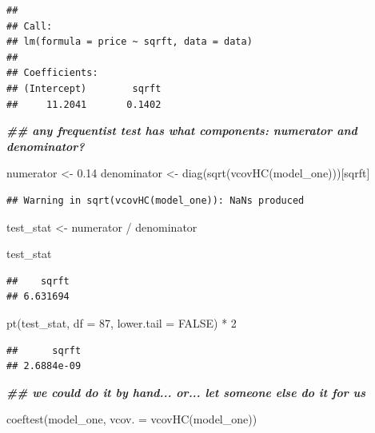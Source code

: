 \documentclass[
]{book}
\newenvironment{Shaded}{\begin{snugshade}}{\end{snugshade}}
\newcommand{\AttributeTok}[1]{\textcolor[rgb]{0.77,0.63,0.00}{#1}}
\newcommand{\ConstantTok}[1]{\textcolor[rgb]{0.00,0.00,0.00}{#1}}
\newcommand{\DecValTok}[1]{\textcolor[rgb]{0.00,0.00,0.81}{#1}}
\newcommand{\DocumentationTok}[1]{\textcolor[rgb]{0.56,0.35,0.01}{\textbf{\textit{#1}}}}
\newcommand{\FloatTok}[1]{\textcolor[rgb]{0.00,0.00,0.81}{#1}}
\newcommand{\FunctionTok}[1]{\textcolor[rgb]{0.00,0.00,0.00}{#1}}
\newcommand{\NormalTok}[1]{#1}
\newcommand{\OtherTok}[1]{\textcolor[rgb]{0.56,0.35,0.01}{#1}}
\newcommand{\SpecialCharTok}[1]{\textcolor[rgb]{0.00,0.00,0.00}{#1}}
\newcommand{\StringTok}[1]{\textcolor[rgb]{0.31,0.60,0.02}{#1}}
\theoremstyle{definition}
\theoremstyle{definition}
\theoremstyle{definition}
\theoremstyle{definition}
\theoremstyle{remark}
\begin{document}
\begin{verbatim}
## 
## Call:
## lm(formula = price ~ sqrft, data = data)
## 
## Coefficients:
## (Intercept)        sqrft  
##     11.2041       0.1402
\end{verbatim}

\begin{Shaded}
\begin{Highlighting}[]
\DocumentationTok{\#\# any frequentist test has what components: numerator and denominator? }

\NormalTok{numerator   }\OtherTok{\textless{}{-}} \FloatTok{0.14}
\NormalTok{denominator }\OtherTok{\textless{}{-}} \FunctionTok{diag}\NormalTok{(}\FunctionTok{sqrt}\NormalTok{(}\FunctionTok{vcovHC}\NormalTok{(model\_one)))[}\StringTok{\textquotesingle{}sqrft\textquotesingle{}}\NormalTok{]}
\end{Highlighting}
\end{Shaded}

\begin{verbatim}
## Warning in sqrt(vcovHC(model_one)): NaNs produced
\end{verbatim}

\begin{Shaded}
\begin{Highlighting}[]
\NormalTok{test\_stat }\OtherTok{\textless{}{-}}\NormalTok{ numerator }\SpecialCharTok{/}\NormalTok{ denominator}

\NormalTok{test\_stat}
\end{Highlighting}
\end{Shaded}

\begin{verbatim}
##    sqrft 
## 6.631694
\end{verbatim}

\begin{Shaded}
\begin{Highlighting}[]
\FunctionTok{pt}\NormalTok{(test\_stat, }\AttributeTok{df =} \DecValTok{87}\NormalTok{, }\AttributeTok{lower.tail =} \ConstantTok{FALSE}\NormalTok{) }\SpecialCharTok{*} \DecValTok{2}
\end{Highlighting}
\end{Shaded}

\begin{verbatim}
##      sqrft 
## 2.6884e-09
\end{verbatim}

\begin{Shaded}
\begin{Highlighting}[]
\DocumentationTok{\#\# we could do it by hand... or... let someone else do it for us}

\FunctionTok{coeftest}\NormalTok{(model\_one, }\AttributeTok{vcov. =} \FunctionTok{vcovHC}\NormalTok{(model\_one))}
\end{Highlighting}
\end{Shaded}
\end{document}
